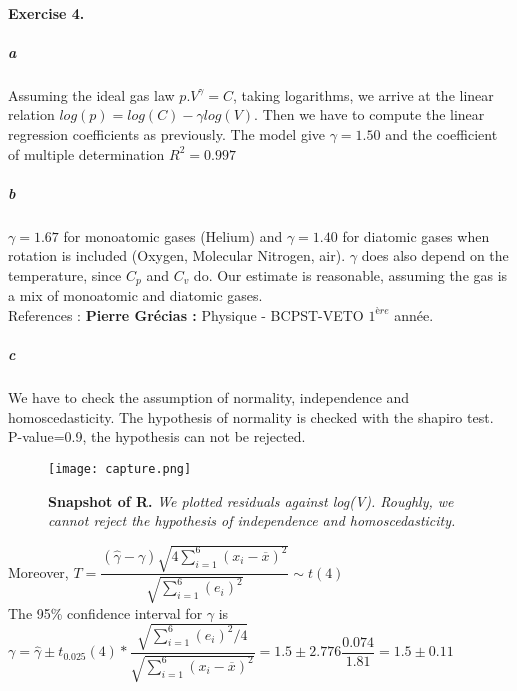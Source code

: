 \documentclass{article}
\begin{document}
\paragraph{Exercise 4.}
\subparagraph{a}
Assuming the ideal gas law $p.V^{\gamma}=C$, taking logarithms, we arrive at the linear relation $log(p)=log(C)-\gamma log(V)$.
Then we have to compute the linear regression coefficients as previously. The model give $\gamma=1.50$ and the coefficient of multiple determination $R^2=0.997$ 
\subparagraph{b}
$\gamma=1.67$ for monoatomic gases (Helium) and $\gamma=1.40$ for diatomic gases when rotation is included (Oxygen, Molecular Nitrogen, air). $\gamma$ does also depend on the temperature, since $C_p$ and $C_v$ do. Our estimate is reasonable, assuming the gas is a mix of monoatomic and diatomic gases. \\
References : \textbf{Pierre Grécias :} Physique - BCPST-VETO $1^{ère}$ année.
\subparagraph{c}
We have to check the assumption of normality, independence and homoscedasticity.
The hypothesis of normality is checked with the shapiro test. P-value=0.9, the hypothesis can not be rejected.
\begin{figure}[H]
	  \centering
  	\texttt{[image: capture.png]}
  	\caption{\textbf{Snapshot of R.} \textsl{We plotted residuals against log(V). Roughly, we cannot reject the hypothesis of independence and homoscedasticity.}
  	}
	\end{figure}
Moreover, $T= \dfrac{(\widehat{\gamma}-\gamma)\sqrt{4 \sum_{i=1}^6 (x_i-\overline{x})^2 } }
{\sqrt{\sum_{i=1}^6(e_i)^2}} \sim t(4) $\\
The 95\% confidence interval for $\gamma$ is 
$\gamma=\widehat{\gamma} \pm t_{0.025}(4)*\dfrac{\sqrt{\sum_{i=1}^6(e_i)^2/4 }}
{\sqrt{\sum_{i=1}^6 (x_i-\overline{x})^2 }}=1.5 \pm 2.776 \dfrac{0.074}{1.81}=1.5 \pm 0.11 $
\end{document}
